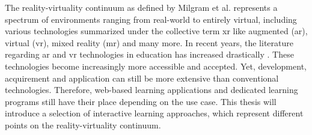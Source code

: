The reality-virtuality continuum as defined by Milgram et al. \cite{milgram1994arc} represents a spectrum of environments ranging from real-world to entirely virtual, including various technologies summarized under the collective term \acrfull{xr} like augmented (\acrshort{ar}), virtual (\acrshort{vr}), mixed reality (\acrshort{mr}) and many more. In recent years, the literature regarding \acrshort{ar} and \acrshort{vr} technologies in education has increased drastically \cite{alansi2023analyzing}. These technologies become increasingly more accessible and accepted. Yet, development, acquirement and application can still be more extensive than conventional technologies. Therefore, web-based learning applications and dedicated learning programs still have their place depending on the use case. This thesis will introduce a selection of interactive learning approaches, which represent different points on the reality-virtuality continuum. 


